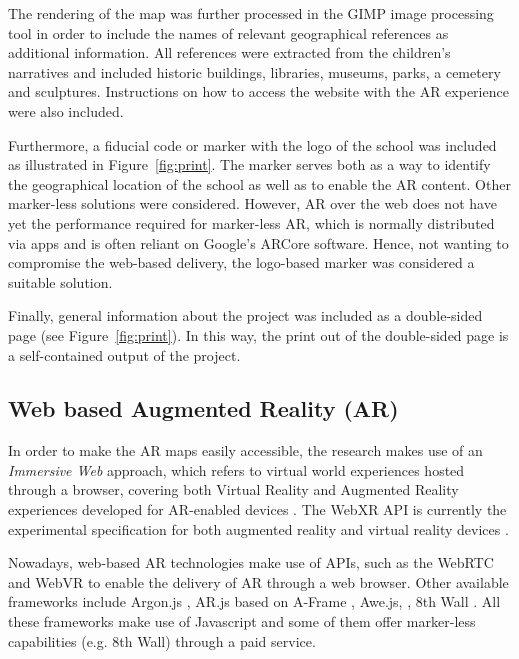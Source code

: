 \documentclass[acmlarge,screen,dvipsnames]{acmart}
\begin{document}
The rendering of the map was further processed in the GIMP image processing
tool \cite{gimp} in order to include the names of relevant
geographical references as additional information. All references were extracted from the children's
narratives and included historic buildings, libraries, museums, parks,
a cemetery and sculptures. Instructions on how to access the website with the AR
experience were also included.

Furthermore, a fiducial code or marker with the logo of the school was
included as illustrated in Figure~\ref{fig:print}. The marker serves both as a
way to identify the geographical location of the school as well as to enable
the AR content. Other marker-less solutions were considered. However, AR over
the web does not have yet the performance required for marker-less AR, which
is normally distributed via apps and is often reliant on Google's ARCore
software. Hence, not wanting to compromise the web-based delivery, the
logo-based marker was considered a suitable solution.


Finally, general information about the project was included as a
double-sided page (see Figure~\ref{fig:print}). In this way, the print out of the double-sided
page is a self-contained output of the project.





\subsection{Web based Augmented Reality (AR)} %

In order to make the AR maps easily
accessible, the research makes use of an \emph{Immersive Web} approach, which
refers to virtual world experiences hosted through a browser, covering both
Virtual Reality and Augmented Reality experiences developed for AR-enabled
devices \cite{imweb}. The WebXR API is currently the experimental
specification for both augmented reality and virtual reality devices
\cite{webxr}.

Nowadays, web-based AR technologies make use of APIs, such as the WebRTC and WebVR
to enable the delivery of AR through a web browser. Other available frameworks include Argon.js \cite{Argon.js}, AR.js based on A-Frame
\cite{aframe}, Awe.js, \cite{Awe.js}, 8th Wall \cite{8th}. All these
frameworks make use of Javascript and some of them offer marker-less
capabilities (e.g. 8th Wall) through a paid service.
\end{document}
